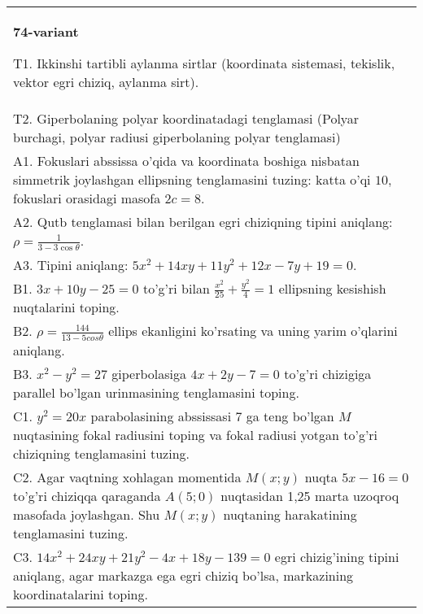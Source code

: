 \documentclass{article}
\begin{document}
\begin{tabular}{m{17cm}}
\textbf{74-variant}
\newline

T1. Ikkinshi tartibli aylanma sirtlar (koordinata sistemasi, tekislik, vektor egri chiziq, aylanma sirt).\\

T2. Giperbolaning polyar koordinatadagi tenglamasi (Polyar burchagi, polyar radiusi giperbolaning polyar tenglamasi)\\

A1. Fokuslari abssissa o'qida va koordinata boshiga nisbatan simmetrik joylashgan ellipsning tenglamasini tuzing: katta o'qi $10$, fokuslari orasidagi masofa $2c=8$.\\

A2. Qutb tenglamasi bilan berilgan egri chiziqning tipini aniqlang: $\rho=\frac{1}{3-3\cos\theta}$.\\

A3. Tipini aniqlang: $5x^{2}+14xy+11y^{2}+12x-7y+19=0$.\\

B1. $3x + 10y - 25 = 0$ to'g'ri bilan $\frac{x^{2}}{25} + \frac{y^{2}}{4} = 1$ ellipsning kesishish nuqtalarini toping.  \\

B2. $\rho = \frac{144}{13 - 5cos\theta}$ ellips ekanligini ko'rsating va uning yarim o'qlarini aniqlang.\\

B3. $x^{2} - y^{2} = 27$ giperbolasiga $4x + 2y - 7 = 0$ to'g'ri chizigiga parallel bo'lgan urinmasining tenglamasini toping.  \\

C1. $y^{2} = 20x$ parabolasining abssissasi 7 ga teng bo'lgan $M$ nuqtasining fokal radiusini toping va fokal radiusi yotgan to'g'ri chiziqning tenglamasini tuzing.  \\

C2. Agar vaqtning xohlagan momentida $M(x;y)$ nuqta $5x - 16 = 0$ to'g'ri chiziqqa qaraganda $A(5;0)$ nuqtasidan 1,25 marta uzoqroq masofada joylashgan. Shu $M(x;y)$ nuqtaning harakatining tenglamasini tuzing.  \\

C3. $14x^{2} + 24xy + 21y^{2} - 4x + 18y - 139 = 0$ egri chizig'ining tipini aniqlang, agar markazga ega egri chiziq bo'lsa, markazining koordinatalarini toping.  \\

\end{tabular}
\vspace{1cm}
\end{document}
